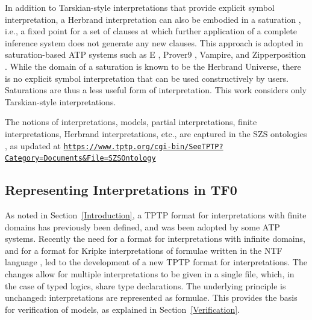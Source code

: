 \documentclass{easychair}
\newcommand{\smalltt}[1]{\small \texttt{#1}}
\begin{document}
In addition to Tarskian-style interpretations that provide explicit symbol interpretation, 
a Herbrand interpretation can also be embodied in a saturation \cite{BG+01},
i.e., a fixed point for a set of clauses at which further application of a complete inference 
system does not generate any new clauses.
This approach is adopted in saturation-based ATP systems such as E \cite{SCV19},
Prover9 \cite{McC-Prover9-URL}, Vampire, and Zipperposition \cite{VB+21}.
While the domain of a saturation is known to be the Herbrand Universe, there is no explicit
symbol interpretation that can be used constructively by users.
Saturations are thus a less useful form of interpretation.
This work considers only Tarskian-style interpretations.

The notions of interpretations, models, partial interpretations, finite interpretations,
Herbrand interpretations, etc., are captured in the SZS ontologies \cite{Sut08-KEAPPA}, as
updated at 
{\smalltt{\url{https://www.tptp.org/cgi-bin/SeeTPTP?Category=Documents&File=SZSOntology}}}

\subsection{Representing Interpretations in TF0}
\label{InterpretationsTF0}

As noted in Section~\ref{Introduction}, a TPTP format for interpretations with finite domains 
has previously been defined, and was been adopted by some ATP systems.
Recently the need for a format for interpretations with infinite domains, and for a format for 
Kripke interpretations \cite{Kri63} of formulae written in the NTF language \cite{SF+22}, 
led to the development of a new TPTP format for interpretations.
The changes allow for multiple interpretations to be given in a single file, which, in the case 
of typed logics, share type declarations.
The underlying principle is unchanged: interpretations are represented as formulae.
This provides the basis for verification of models, as explained in Section~\ref{Verification}.
\end{document}
